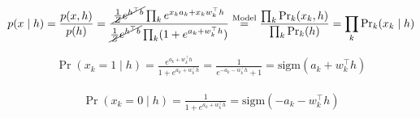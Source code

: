 \documentclass[a4paper]{article}
\newcommand{\sigm}{\text{sigm}}
\newcommand{\1}{\mathds{1}}
\begin{document}
\begin{gather*}
p(x \mid h) = {p(x, h) \over p(h)} 
= 
\frac{\cancel{{1\over Z} e^{h^\top b}}\prod_k e^{x_ka_k + x_kw_k^\top h} }
{\cancel{{1\over Z} e^{h^\top b}}\prod_k (1 + e^{a_k + w_k^\top h})}
\stackrel{\text{Model}}{=}
\frac{\prod_k {\Pr}_k(x_k, h)}{\prod_k {\Pr}_k(h)}
=
\prod_k {\Pr}_k(x_k \mid h)
\end{gather*}


\begin{gather*}
\Pr(x_k = 1 \mid h) 
=
\frac{e^{a_k + w_k^\top h} }
{1 + e^{a_k + w_k^\top h}}
=
\frac{1}
{e^{-a_k - w_k^\top h} + 1}
= 
\sigm(a_k + w_k^\top h)
\end{gather*}

\begin{gather*}
\Pr(x_k = 0 \mid h) 
=
\frac{1}
{1 + e^{a_k + w_k^\top h}}
=
\sigm(- a_k - w_k^\top h)
\end{gather*}
\end{document}
